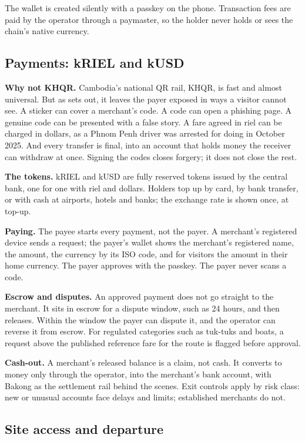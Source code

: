 \documentclass[10pt,letterpaper,twocolumn]{article}
\newcommand{\runin}[1]{\textbf{#1}\quad}
\begin{document}
The wallet is created silently with a passkey on the phone. Transaction fees
are paid by the operator through a paymaster, so the holder never holds or sees
the chain's native currency.

\subsection{Payments: kRIEL and kUSD}
\label{sec:payments}

\runin{Why not KHQR.} Cambodia's national QR rail, KHQR, is fast and almost
universal. But as \citet{chay2026qrseal} sets out, it leaves the payer exposed
in ways a visitor cannot see. A sticker can cover a merchant's code. A code can
open a phishing page. A genuine code can be presented with a false story. A
fare agreed in riel can be charged in dollars, as a Phnom Penh driver was
arrested for doing in October 2025. And every transfer is final, into an
account that holds money the receiver can withdraw at once. Signing the codes
closes forgery; it does not close the rest.

\runin{The tokens.} kRIEL and kUSD are fully reserved tokens issued by the
central bank, one for one with riel and dollars. Holders top up by card, by
bank transfer, or with cash at airports, hotels and banks; the exchange rate is
shown once, at top-up.

\runin{Paying.} The payee starts every payment, not the payer. A merchant's
registered device sends a request; the payer's wallet shows the merchant's
registered name, the amount, the currency by its ISO code, and for visitors the
amount in their home currency. The payer approves with the passkey. The payer
never scans a code.

\runin{Escrow and disputes.} An approved payment does not go straight to the
merchant. It sits in escrow for a dispute window, such as 24 hours, and then
releases. Within the window the payer can dispute it, and the operator can
reverse it from escrow. For regulated categories such as tuk-tuks and boats, a
request above the published reference fare for the route is flagged before
approval.

\runin{Cash-out.} A merchant's released balance is a claim, not cash. It
converts to money only through the operator, into the merchant's bank account,
with Bakong as the settlement rail behind the scenes. Exit controls apply by
risk class: new or unusual accounts face delays and limits; established
merchants do not.

\subsection{Site access and departure}
\end{document}

